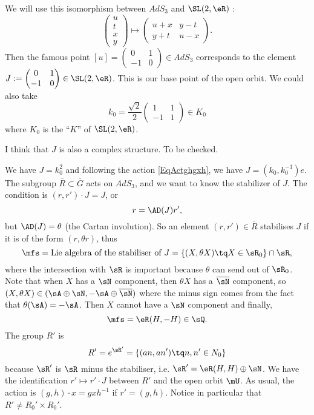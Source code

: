 We will use this isomorphism between $AdS_3$ and $\SL(2,\eR)$ :
\[ 
  \begin{pmatrix}
u\\t\\x\\y
\end{pmatrix}\mapsto
\begin{pmatrix}
u+x&y-t\\y+t&u-x
\end{pmatrix}.
\]
Then the famous point $[u]=\begin{pmatrix}
0&1\\-1&0
\end{pmatrix}\in AdS_3$ corresponds to the element $J:=\begin{pmatrix}
0&1\\-1&0
\end{pmatrix}\in \SL(2,\eR)$. This is our base point of the open orbit. We could also take
\[ 
  k_{0}=\frac{ \sqrt 2 }{ 2 }\begin{pmatrix}
1&1\\-1&1
\end{pmatrix}\in K_{0}
\]
where $K_{0}$ is the ``$K$'' of $\SL(2,\eR)$. 
\begin{probleme}
    I think that $J$ is also a complex structure. To be checked.
\end{probleme}
We have $J=k_{0}^{2}$ and following the action \eqref{EqActghgxh}, we have $J=(k_{0},k_{0}^{-1})e$. The subgroup $\overline{R}\subset\overline{G}$ acts on $AdS_3$, and we want to know the stabilizer of $J$. The condition is $(r,r')\cdot J=J$, or
\[ 
  r=\AD(J)r',
\]
but $\AD(J)=\theta$ (the Cartan involution). So an element $(r,r')\in\overline{R}$ stabilises $J$ if it is of the form $(r,\theta r)$, thus
\[ 
  \mfs=\text{Lie algebra of the stabiliser of $J$}=\{ (X,\theta X)\tq X\in\sR_{0} \}\cap\sR,
\]
where the intersection with $\sR$ is important because $\theta$ can send out of $\sR_{0}$. Note that when $X$ has a $\sN$ component, then $\theta X$ has a $\overline{ \sN }$ component, so $(X,\theta X)\in(\sA\oplus\sN,-\sA\oplus\overline{ \sN })$ where the minus sign comes from the fact that $\theta(\sA)=-\sA$. Then $X$ cannot have a $\sN$ component and finally,
\[ 
  \mfs=\eR (H,-H)\in\sQ.
\]
The group $R'$ is
\begin{equation}
R'= e^{\sR'}=\{ (an,an')\tq n,n'\in N_{0} \}
\end{equation}
because $\sR'$ is $\sR$ minus the stabiliser, i.e. $\sR'=\eR(H,H)\oplus\sN$. We have the identification $r'\mapsto r'\cdot J$ between $R'$ and the open orbit $\mU$. As usual, the action is $(g,h)\cdot x=gxh^{-1}$ if $r'=(g,h)$. Notice in particular that $R'\neq R_{0}'\times R_{0}'$.

